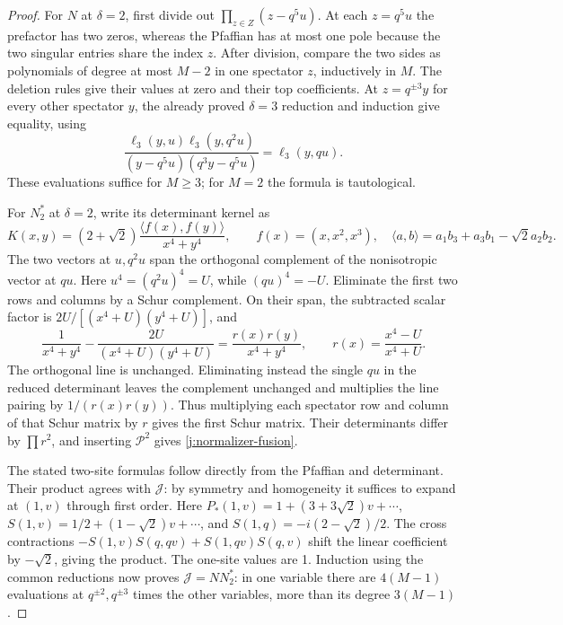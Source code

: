 \begin{proof}
For $N$ at $\delta=2$, first divide out
$\prod_{z\in Z}(z-q^5u)$. At each $z=q^5u$ the prefactor has two
zeros, whereas the Pfaffian has at most one pole because the two
singular entries share the index $z$. After division, compare the two
sides as polynomials of degree at most $M-2$ in one spectator $z$,
inductively in $M$. The deletion rules give their values at zero and
their top coefficients. At $z=q^{\pm3}y$ for every other spectator
$y$, the already proved $\delta=3$ reduction and induction give
equality, using
\[
\frac{\ell_3(y,u)\ell_3(y,q^2u)}
     {(y-q^5u)(q^3y-q^5u)}=\ell_3(y,qu).
\]
These evaluations suffice for $M\ge3$; for $M=2$ the formula is
tautological.

For $N_2^*$ at $\delta=2$, write its determinant kernel as
\[
K(x,y)=(2+\sqrt2)\frac{\langle f(x), f(y)\rangle}{x^4+y^4},\qquad
 f(x)=(x,x^2,x^3),\quad \langle a,b\rangle=a_1b_3+a_3b_1-\sqrt2a_2b_2.
\]
The two vectors at $u,q^2u$ span the orthogonal complement of the
nonisotropic vector at $qu$. Here $u^4=(q^2u)^4=U$, while
$(qu)^4=-U$. Eliminate the first two rows and columns by a Schur
complement. On their span, the subtracted scalar factor is
$2U/[(x^4+U)(y^4+U)]$, and
\[
\frac1{x^4+y^4}-\frac{2U}{(x^4+U)(y^4+U)}
 =\frac{r(x)r(y)}{x^4+y^4},\qquad
r(x)=\frac{x^4-U}{x^4+U}.
\]
The orthogonal line is unchanged. Eliminating instead the single
$qu$ in the reduced determinant leaves the complement unchanged and
multiplies the line pairing by $1/(r(x)r(y))$. Thus multiplying each
spectator row and column of that Schur matrix by $r$ gives the first
Schur matrix. Their determinants differ by $\prod r^2$, and inserting
$\mathcal P^2$ gives \eqref{j:normalizer-fusion}.

The stated two-site formulas follow directly from the Pfaffian and
determinant. Their product agrees with $\mathcal J$: by symmetry and
homogeneity it suffices to expand at $(1,v)$ through first order.
Here
$P_*(1,v)=1+(3+3\sqrt2)v+\cdots$,
$S(1,v)=1/2+(1-\sqrt2)v+\cdots$, and
$S(1,q)=-i(2-\sqrt2)/2$. The cross contractions
$-S(1,v)S(q,qv)+S(1,qv)S(q,v)$ shift the linear coefficient by
$-\sqrt2$, giving the product. The one-site values are 1.
Induction using the common reductions now proves
$\mathcal J=NN_2^*$: in one variable there are $4(M-1)$ evaluations
at $q^{\pm2},q^{\pm3}$ times the other variables, more than its degree
$3(M-1)$.


\end{proof}
